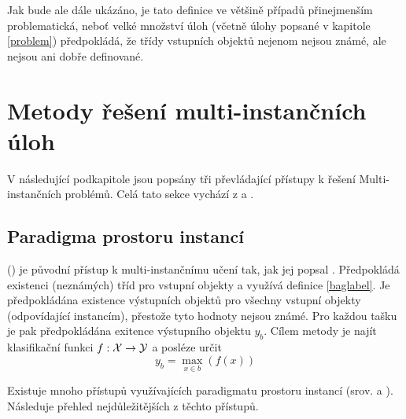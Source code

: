 Jak bude ale dále ukázáno, je tato definice ve většině případů přinejmenším problematická, neboť velké množství úloh (včetně úlohy popsané v kapitole \ref{problem}) předpokládá, že třídy vstupních objektů nejenom nejsou známé, ale nejsou ani dobře definované.

\section{Metody řešení multi-instančních úloh}

V následující podkapitole jsou popsány tři převládající přístupy k řešení Multi-instančních problémů. Celá tato sekce vychází z \cite{pevny_using_2016} a \cite{pevny_discriminative_2016}.

\subsection{Paradigma prostoru instancí}
 () je původní přístup k multi-instančnímu učení tak, jak jej popsal \cite{dietterich_solving_1997}. Předpokládá existenci (neznámých) tříd pro vstupní objekty a využívá definice \ref{baglabel}.
Je předpokládána existence výstupních objektů pro všechny vstupní objekty (odpovídající instancím), přestože tyto hodnoty nejsou známé. Pro každou tašku je pak předpokládána exitence výstupního objektu \( y_b \). Cílem metody je najít klasifikační funkci \( f : \mathcal X \to \mathcal Y \) a posléze určit
\[ y_b = \max_{x \in b} \left( f \left( x \right) \right) \]

Existuje mnoho přístupů využívajících paradigmatu prostoru instancí (srov. \cite{andrews_support_2003} a \cite{zhang_multiple_2006}). Následuje přehled nejdůležitějších z těchto přístupů.

